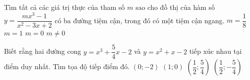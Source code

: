 \begin{ex}%
	Tìm tất cả các giá trị thực của tham số $m$ sao cho đồ thị của hàm số $y = \dfrac{mx^3 - 1}{x^2 - 3x + 2}$ có ba đường tiệm cận, trong đó có một tiệm cận ngang.
	\choice
	{$m = \dfrac{1}{8}$}
	{$m = 1$}
	{\True $m = 0$}
	{$m \neq 0$}
\end{ex}

\begin{ex}%
	Biết rằng hai đường cong $y = x^3 + \dfrac{5}{4}x - 2$ và $y = x^2 + x - 2$ tiếp xúc nhau tại điểm duy nhất. Tìm tọa độ tiếp điểm đó.
	\choice
	{$\left(0; -2\right)$}
	{$\left(1; 0\right)$}
	{\True $\left(\dfrac{1}{2}; \dfrac{5}{4}\right)$}
	{$\left(\dfrac{1}{2}; -\dfrac{5}{4}\right)$}
\end{ex}

